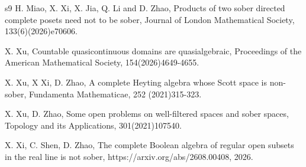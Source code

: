 \documentclass[preprint,12pt]{elsarticle}
\numberwithin{equation}{section}
\begin{document}
\begin{thebibliography}{s9}
 H. Miao, X. Xi, X. Jia, Q. Li and D. Zhao, Products of two sober directed complete posets need not to be sober, Journal of London Mathematical Society, 133(6)(2026)e70606.

 X. Xu, Countable quasicontinuous domains are quasialgebraic, Proceedings of the American Mathematical Society, 154(2026)4649-4655.

 X. Xu, X Xi, D. Zhao, A complete Heyting algebra whose Scott space is non-sober, Fundamenta Mathematicae, 252 (2021)315-323.

 X. Xu, D. Zhao, Some open problems on well-filtered spaces and sober spaces, Topology and its Applications, 301(2021)107540.


 X. Xi, C. Shen, D. Zhao, The complete Boolean algebra of regular open subsets in the real line is not sober, https://arxiv.org/abs/2608.00408, 2026.







\end{thebibliography}
\end{document}
